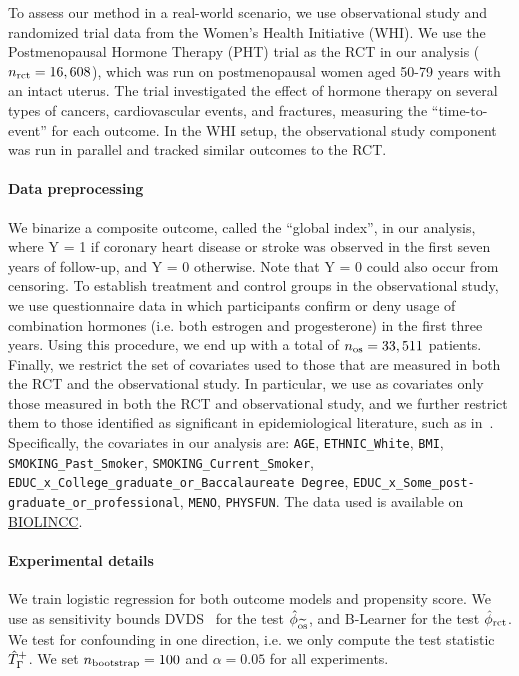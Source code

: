 To assess our method in a real-world scenario, we use observational study and randomized trial data from the Women’s Health Initiative (WHI). We use the Postmenopausal Hormone Therapy (PHT) trial as the RCT in our analysis ($n_{\operatorname{rct}}=16,608$), which was run on postmenopausal women aged 50-79 years with an intact uterus. The trial investigated the effect of hormone therapy on several types of cancers, cardiovascular events, and fractures, measuring the “time-to-event” for each outcome. In the WHI setup, the observational study component was run in parallel and tracked similar outcomes to the RCT. 


\paragraph{Data preprocessing} 
We binarize a composite outcome, called the “global index”, in our analysis, where Y = 1 if coronary heart disease or stroke was observed in the first seven years of follow-up, and Y = 0 otherwise. Note that Y = 0 could also occur from censoring. To establish treatment and control groups in the observational study, we use questionnaire data in which participants confirm or deny usage of combination hormones (i.e. both estrogen and progesterone) in the first three years. Using this procedure, we end up
 with a total of $n_{\operatorname{os}} = 33,511$ patients. Finally, we restrict the set of covariates used to those that are measured in both the RCT and the observational study.  In particular, we use as covariates only those measured in both the RCT and observational study, and we further restrict them to those identified as significant in epidemiological literature, such as in~\citep{prentice2005combined}. Specifically, the covariates in our analysis are: \texttt{AGE}, \texttt{ETHNIC\_White}, \texttt{BMI}, \texttt{SMOKING\_Past\_Smoker}, \texttt{SMOKING\_Current\_Smoker}, \texttt{EDUC\_x\_College\_graduate\_or\_Baccalaureate Degree}, \texttt{EDUC\_x\_Some\_post-graduate\_or\_professional}, \texttt{MENO}, \texttt{PHYSFUN}. The data used is available on \href{(https://biolincc.nhlbi.nih.gov/studies/whi_ctos)}{BIOLINCC}.







\paragraph{Experimental details}We train logistic regression for both outcome models and propensity score. We use as sensitivity bounds DVDS~\citep{dorn2021doubly} for the test $\hat{\phi}_{\widetilde{\mathrm{os}}}$, and B-Learner for the test $\hat{\phi}_{\mathrm{rct}}$. We test for confounding in one direction, i.e. we only compute the test statistic $\hat{T}_\Gamma^+$. We set $n_{\text{bootstrap}}=100$ and $\alpha=0.05$ for all experiments.
